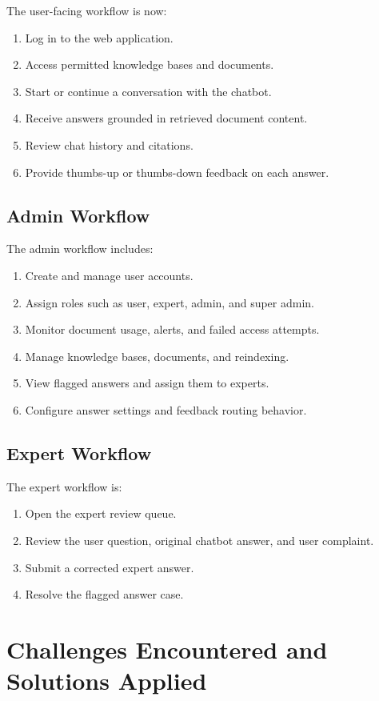 \documentclass[12pt,a4paper]{report}
\begin{document}
The user-facing workflow is now:
\begin{enumerate}[leftmargin=1.5em]
\item Log in to the web application.
\item Access permitted knowledge bases and documents.
\item Start or continue a conversation with the chatbot.
\item Receive answers grounded in retrieved document content.
\item Review chat history and citations.
\item Provide thumbs-up or thumbs-down feedback on each answer.
\end{enumerate}

\section{Admin Workflow}

The admin workflow includes:
\begin{enumerate}[leftmargin=1.5em]
\item Create and manage user accounts.
\item Assign roles such as user, expert, admin, and super admin.
\item Monitor document usage, alerts, and failed access attempts.
\item Manage knowledge bases, documents, and reindexing.
\item View flagged answers and assign them to experts.
\item Configure answer settings and feedback routing behavior.
\end{enumerate}

\section{Expert Workflow}

The expert workflow is:
\begin{enumerate}[leftmargin=1.5em]
\item Open the expert review queue.
\item Review the user question, original chatbot answer, and user complaint.
\item Submit a corrected expert answer.
\item Resolve the flagged answer case.
\end{enumerate}

\chapter{Challenges Encountered and Solutions Applied}
\end{document}
